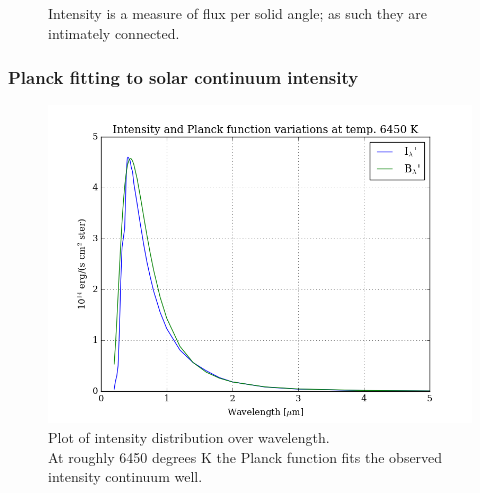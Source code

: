 \documentclass[11pt,a4paper,notitlepage]{article}
\begin{document}
\begin{figure}[H]
\caption{Intensity is a measure of flux per solid angle; as such they are intimately connected.}
\end{figure}

\subsubsection{Planck fitting to solar continuum intensity}
\begin{figure}[H]
\center

	\includegraphics[scale=0.42]{../figs/2obs_planck.png}
	\caption{Plot of intensity distribution over wavelength.\\
	At roughly 6450 degrees K the Planck function fits the observed intensity continuum well.}
\end{figure}
\end{document}
